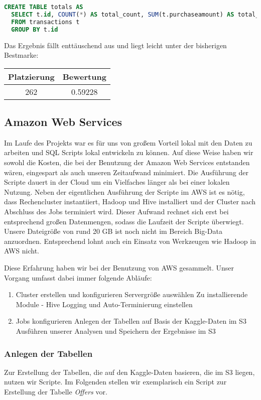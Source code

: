 \begin{lstlisting}[language=SQL]
CREATE TABLE totals AS
  SELECT t.id, COUNT(*) AS total_count, SUM(t.purchaseamount) AS total_spent
  FROM transactions t
  GROUP BY t.id
\end{lstlisting}

Das Ergebnis fällt enttäuschend aus und liegt leicht unter der bisherigen Bestmarke:
\begin{tabular}{|c|c|}
	\hline \textbf{Platzierung} & \textbf{Bewertung} \\ 
	\hline 262 & 0.59228  \\ 
	\hline 
\end{tabular}

\subsection{Amazon Web Services}
Im Laufe des Projekts war es für uns von großem Vorteil lokal mit den Daten zu arbeiten und SQL Scripts lokal entwickeln zu können. Auf diese Weise haben wir sowohl die Kosten, die bei der Benutzung der Amazon Web Services entstanden wären, eingespart als auch unseren Zeitaufwand minimiert. Die Ausführung der Scripte dauert in der Cloud um ein Vielfaches länger als bei einer lokalen Nutzung. Neben der eigentlichen Ausführung der Scripte im AWS ist es nötig, dass Rechencluster instantiiert, Hadoop und Hive installiert und der Cluster nach Abschluss des Jobs terminiert wird. Dieser Aufwand rechnet sich erst bei entsprechend großen Datenmengen, sodass die Laufzeit der Scripte überwiegt. Unsere Dateigröße von rund 20 GB ist noch nicht im Bereich Big-Data anzuordnen. Entsprechend lohnt auch ein Einsatz von Werkzeugen wie Hadoop in AWS nicht.

Diese Erfahrung haben wir bei der Benutzung von AWS gesammelt. Unser Vorgang umfasst dabei immer folgende Abläufe:
\begin{enumerate}
\item Cluster erstellen und konfigurieren
\subitem Servergröße auswählen
\subitem Zu installierende Module - Hive
\subitem Logging und Auto-Terminierung einstellen
\item Jobs konfigurieren
\subitem Anlegen der Tabellen auf Basis der Kaggle-Daten im S3
\subitem Ausführen unserer Analysen und Speichern der Ergebnisse im S3
\end{enumerate}

\subsubsection{Anlegen der Tabellen}
Zur Erstellung der Tabellen, die auf den Kaggle-Daten basieren, die im S3 liegen, nutzen wir Scripte. Im Folgenden stellen wir exemplarisch ein Script zur Erstellung der Tabelle \textit{Offers} vor. 

